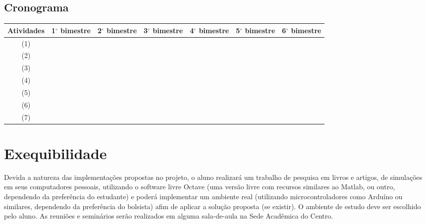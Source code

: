 \documentclass[11pt]{article}
\begin{document}
	
	\subsection{Cronograma}
	
\begin{table}[h]
\centering
	\begin{tabular}{| c || c | c | c | c | c | c |}
	\hline 
	Atividades & 1$^{\circ}$ bimestre & 2$^{\circ}$ bimestre & 3$^{\circ}$ bimestre & 4$^{\circ}$ bimestre  & 5$^{\circ}$ bimestre & 6$^{\circ}$ bimestre \\ \hline \hline
	(1) & \cellcolor{gray} & \cellcolor{gray} & \cellcolor{gray} &  & &\\ \hline
	(2) & \cellcolor{gray} & \cellcolor{gray} & \cellcolor{gray} &  & &\\ \hline
	(3) & \cellcolor{gray} & \cellcolor{gray} & \cellcolor{gray} & \cellcolor{gray} &\cellcolor{gray} & \\ \hline
	(4) &  & & & \cellcolor{gray} & \cellcolor{gray} & \\ \hline
	(5) &  & & & \cellcolor{gray} & \cellcolor{gray} & \cellcolor{gray} \\ \hline
	(6) &  & & & & & \cellcolor{gray} \\ \hline
	(7) &  & & &  & & \cellcolor{gray} \\
	\hline
	\end{tabular}
\end{table}
	

\section{Exequibilidade}

Devida a natureza das implementações propostas no projeto, o aluno realizará um trabalho de pesquisa em livros e artigos, de simulações em seus computadores pessoais, utilizando o software livre Octave (uma versão livre com recursos similares ao Matlab, ou outro, dependendo da preferência do estudante) e poderá implementar um ambiente real (utilizando microcontroladores como Arduíno ou similares, dependendo da preferência do bolsista) afim de aplicar a solução proposta (se existir). O ambiente de estudo deve ser escolhido pelo aluno. As reuniões e seminários serão realizados em alguma sala-de-aula na Sede Acadêmica do Centro.

{}



\end{document}
